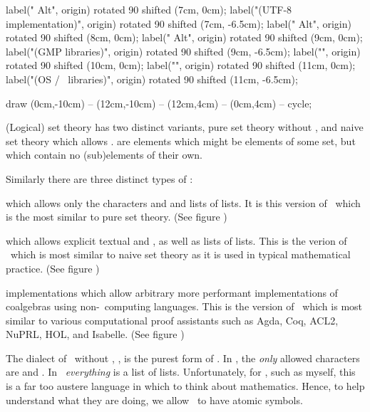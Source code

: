 label(" Alt", origin) rotated 90 shifted (7cm, 0cm);
label("(UTF-8 implementation)", origin) rotated 90 shifted (7cm, -6.5cm);
label(" Alt", origin) rotated 90 shifted (8cm, 0cm);
label(" Alt", origin) rotated 90 shifted (9cm, 0cm);
label("(GMP libraries)", origin) rotated 90 shifted (9cm, -6.5cm);
label("", origin) rotated 90 shifted (10cm, 0cm);
label("", origin) rotated 90 shifted (11cm, 0cm);
label("(OS / \LuaTeX\ libraries)", origin) rotated 90 shifted (11cm, -6.5cm);

draw (0cm,-10cm) -- (12cm,-10cm) -- (12cm,4cm) -- (0cm,4cm) -- cycle;

\stopMPcode\egroup

(Logical) set theory has two distinct variants, pure set theory without 
, and naive set theory which allows 
.  are  elements which 
might be elements of some set, but which contain no (sub)elements of their 
own. 

Similarly there are three distinct types of \joylol: 

\startitemize[1]

\item {} which allows only the characters \quote{(} 
and \quote{)} and lists of lists. It is this version of \joylol\ which is 
the most similar to pure set theory. (See figure ) 

\item {} which allows explicit textual  
and , as well as lists of lists. This is the verion 
of \joylol\ which is most similar to naive set theory as it is used in 
typical mathematical practice. (See figure ) 

\item {} implementations which allow arbitrary 
more performant implementations of coalgebras using non-\joylol\ computing 
languages. This is the version of \joylol\ which is most similar to 
various computational proof assistants such as Agda, Coq, ACL2, NuPRL, 
HOL, and Isabelle. (See figure ) 

\stopitemize 

The dialect of \joylol\ without , \joylolZero, is the 
purest form of \joylol. In \joylolZero, the \emph{only} allowed characters 
are \quote{(} and \quote{)}. In \joylolZero\ \emph{everything} is a list 
of lists. Unfortunately, for , such as 
myself, this is a far too austere language in which to think about 
mathematics. Hence, to help  understand what 
they are doing, we allow \joylol\ to have atomic symbols. 

